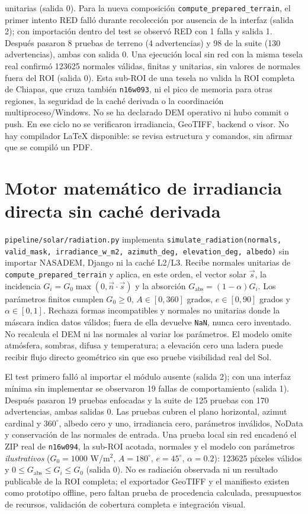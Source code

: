 \documentclass[11pt,a4paper]{article}
\begin{document}
unitarias (salida 0). Para la nueva composición \texttt{compute\_prepared\_terrain}, el primer intento RED falló durante recolección por ausencia de la interfaz (salida 2); con importación dentro del test se observó RED con 1 falla y salida 1. Después pasaron 8 pruebas de terreno (4 advertencias) y 98 de la suite (130 advertencias), ambas con salida 0. Una ejecución local sin red con la misma tesela real confirmó 123625 normales válidas, finitas y unitarias, sin valores de normales fuera del ROI (salida 0). Esta sub-ROI de una tesela no valida la ROI completa de Chiapas, que cruza también \texttt{n16w093}, ni el pico de memoria para otras regiones, la seguridad de la caché derivada o la coordinación multiproceso/Windows. No se ha declarado DEM operativo ni hubo commit o push. En ese ciclo no se verificaron irradiancia, GeoTIFF, backend o visor. No hay compilador LaTeX disponible: se revisa estructura y comandos, sin afirmar que se compiló un PDF.

\section{Motor matemático de irradiancia directa sin caché derivada}
\texttt{pipeline/solar/radiation.py} implementa \texttt{simulate\_radiation(normals, valid\_mask, irradiance\_w\_m2, azimuth\_deg, elevation\_deg, albedo)} sin importar NASADEM, Django ni la caché L2/L3. Recibe normales unitarias de \texttt{compute\_prepared\_terrain} y aplica, en este orden, el vector solar $\vec s$, la incidencia $G_i=G_0\max(0,\vec n\cdot\vec s)$ y la absorción $G_{\mathrm{abs}}=(1-\alpha)G_i$. Los parámetros finitos cumplen $G_0\geq0$, $A\in[0,360]$ grados, $e\in[0,90]$ grados y $\alpha\in[0,1]$. Rechaza formas incompatibles y normales no unitarias donde la máscara indica datos válidos; fuera de ella devuelve \texttt{NaN}, nunca cero inventado. No recalcula el DEM ni las normales al variar los parámetros. El modelo omite atmósfera, sombras, difusa y temperatura; a elevación cero una ladera puede recibir flujo directo geométrico sin que eso pruebe visibilidad real del Sol.

El test primero falló al importar el módulo ausente (salida 2); con una interfaz mínima sin implementar se observaron 19 fallas de comportamiento (salida 1). Después pasaron 19 pruebas enfocadas y la suite de 125 pruebas con 170 advertencias, ambas salidas 0. Las pruebas cubren el plano horizontal, azimut cardinal y $360^\circ$, albedo cero y uno, irradiancia cero, parámetros inválidos, NoData y conservación de las normales de entrada. Una prueba local sin red encadenó el ZIP real de \texttt{n16w094}, la sub-ROI acotada, normales y el modelo con parámetros \emph{ilustrativos} ($G_0=1000$ W/m$^2$, $A=180^\circ$, $e=45^\circ$, $\alpha=0.2$): 123625 píxeles válidos y $0\leq G_{\mathrm{abs}}\leq G_i\leq G_0$ (salida 0). No es radiación observada ni un resultado publicable de la ROI completa; el exportador GeoTIFF y el manifiesto existen como prototipo offline, pero faltan prueba de procedencia calculada, presupuestos de recursos, validación de cobertura completa e integración visual.
\end{document}
